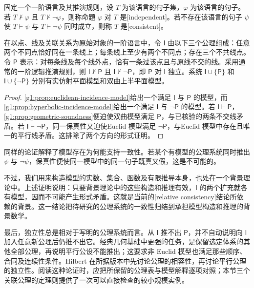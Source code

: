 \begin{definition}
	\label{g1:def:axiom-independence}
	固定一个一阶语言及其推演规则，设 \(T\) 为该语言的句子集，\(\varphi\) 为该语言的句子。若 \(T\nvdash\varphi\) 且 \(T\nvdash\neg\varphi\)，则称命题 \(\varphi\) 对 \(T\) 是[independent]。若不存在该语言的句子 \(\psi\) 使 \(T\vdash\psi\) 与 \(T\vdash\neg\psi\) 同时成立，则称 \(T\) 是[consistent]。
\end{definition}

\begin{theorem}
	\label{g1:thm:incidence-parallel-independence}
	在以点、线及关联关系为原始对象的一阶语言中，令 \(\mathsf I\) 由以下三个公理组成：任意两个不同点恰好同在一条线上；每条线上至少有两个不同点；存在三个不共线点。令 \(\mathsf P\) 表示：对每条线及每个线外点，恰有一条过该点且与原线不交的线。采用通常的一阶逻辑推演规则，则 \(\mathsf I\nvdash\mathsf P\) 且 \(\mathsf I\nvdash\neg\mathsf P\)，即 \(\mathsf P\) 对 \(\mathsf I\) 独立。系统 \(\mathsf I\cup\{\mathsf P\}\) 和 \(\mathsf I\cup\{\neg\mathsf P\}\) 分别有实仿射平面模型和双曲上半平面模型。
\end{theorem}
\begin{proof}
	\cref{g1:prop:euclidean-incidence-model}给出一个满足 \(\mathsf I\) 与 \(\mathsf P\) 的模型，而\cref{g1:prop:hyperbolic-incidence-model}给出一个满足 \(\mathsf I\) 与 \(\neg\mathsf P\) 的模型。若 \(\mathsf I\vdash\mathsf P\)，\cref{g1:prop:geometric-soundness}便迫使双曲模型满足 \(\mathsf P\)，与已核验的两条不交线矛盾。若 \(\mathsf I\vdash\neg\mathsf P\)，同一保真性又迫使Euclid 模型满足 \(\neg\mathsf P\)，与Euclid 模型中存在且唯一的平行线矛盾。这排除了两个方向的形式证明。
\end{proof}

同样的论证解释了模型存在为何能支持一致性。若某个有模型的公理系统同时推出 \(\psi\) 与 \(\neg\psi\)，保真性便使同一模型中的同一句子既真又假，这是不可能的。

\ProseParagraphBreak

不过，我们用来构造模型的实数、集合、函数及有限推导本身，也处在一个背景理论中。上述证明说明：只要背景理论中的这些构造和推理有效，\(\mathsf I\) 的两个扩充就各有模型，因而不可能产生形式矛盾。这就是当前的[relative consistency]结论所依赖的背景。这一结论把待研究的公理系统的一致性归结到承担模型构造和推理的背景数学。

\ProseParagraphBreak

最后，独立性总是相对于写明的公理系统而言。从 \(\mathsf I\) 推不出 \(\mathsf P\)，并不自动说明向 \(\mathsf I\) 加入任意新公理后仍推不出它。经典几何基础中更强的任务，是保留选定体系的其他全部公理，再说明平行公设不能推出；这要求非 Euclid 模型也满足那些顺序、合同及连续性条件。Hilbert 在所据版本\cite[第II章第9--10节]{Hilbert1950Foundations}中先讨论公理的相容性，再讨论平行公理的独立性。阅读这种论证时，应把所保留的公理表与模型解释逐项对照；本节三个关联公理的定理则提供了一次可以直接检查的较小规模实例。

